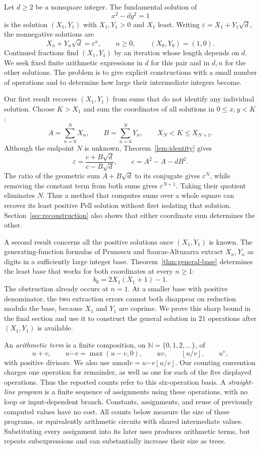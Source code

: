 \documentclass[11pt]{article}
\theoremstyle{remark}
\newcommand{\N}{\mathbb N}
\newcommand{\eps}{\varepsilon}
\newcommand{\tsub}{\mathbin{\dot{-}}}
\newcommand{\md}{\mathbin{\mathrm{mod}}}
\newcommand{\fl}[1]{\left\lfloor #1\right\rfloor}
\begin{document}
Let $d\ge2$ be a nonsquare integer. The fundamental solution of
\[
  x^2-dy^2=1
\]
is the solution $(X_1,Y_1)$ with $X_1,Y_1>0$ and $X_1$ least.
Writing $\eps=X_1+Y_1\sqrt d$, the nonnegative solutions are
\[
  X_n+Y_n\sqrt d=\eps^n,\qquad n\ge0,
  \qquad (X_0,Y_0)=(1,0).
\]
Continued fractions find $(X_1,Y_1)$ by an iteration whose length depends
on $d$. We seek fixed finite arithmetic expressions in $d$ for this pair
and in $d,n$ for the other solutions. The problem is to give explicit
constructions with a small number of operations and to determine how
large their intermediate integers become.

Our first result recovers $(X_1,Y_1)$ from sums that do not identify any
individual solution. Choose $K>X_1$ and sum the
coordinates of all solutions in $0\le x,y<K$:
\[
  A=\sum_{n=0}^N X_n,\qquad B=\sum_{n=0}^N Y_n,
  \qquad X_N<K\le X_{N+1}.
\]
Although the endpoint $N$ is unknown, Theorem~\ref{lem:identity} gives
\[
  \eps=\frac{c+B\sqrt d}{c-B\sqrt d},
  \qquad c=A^2-A-dB^2.
\]
The ratio of the geometric sum $A+B\sqrt d$ to its conjugate gives
$\eps^N$, while removing the constant term from both sums gives
$\eps^{N+1}$.
Taking their quotient eliminates $N$. Thus a method that computes sums
over a whole square can recover its least positive Pell solution without
first isolating that solution. Section~\ref{sec:reconstruction} also
shows that either coordinate sum determines the other.

A second result concerns all the positive solutions once $(X_1,Y_1)$
is known. The generating-function formulas of Prunescu and
Sauras-Altuzarra \cite{PSA25} extract $X_n,Y_n$ as digits in a sufficiently
large integer base. Theorem~\ref{thm:general-base} determines the least
base that works for both coordinates at every $n\ge1$:
\[
  b_0=2X_1(X_1+1)-1.
\]
The obstruction already occurs at $n=1$. At a smaller base with positive
denominator, the two extraction errors cannot both disappear on reduction
modulo the base, because $X_1$ and $Y_1$ are coprime.
We prove this sharp bound in the final section and use it to construct
the general solution in $21$ operations after $(X_1,Y_1)$ is available.

An \emph{arithmetic term} is a finite composition, on
$\N=\{0,1,2,\ldots\}$, of
\[
  u+v,\qquad u\tsub v=\max(u-v,0),\qquad uv,
  \qquad \fl{u/v},\qquad u^v,
\]
with positive divisors. We also use
$u\md v=u\tsub v\fl{u/v}$.
Our counting convention charges one operation for remainder, as well as
one for each of the five displayed operations. Thus the reported counts
refer to this six-operation basis. A \emph{straight-line program} is a
finite sequence of assignments using these operations, with no loop or
input-dependent branch. Constants, assignments, and reuse of previously
computed values have no cost. All counts below measure the size of these
programs, or equivalently arithmetic circuits with shared intermediate
values. Substituting every assignment into its later uses produces
arithmetic terms, but repeats subexpressions and can substantially
increase their size as trees.
\end{document}
